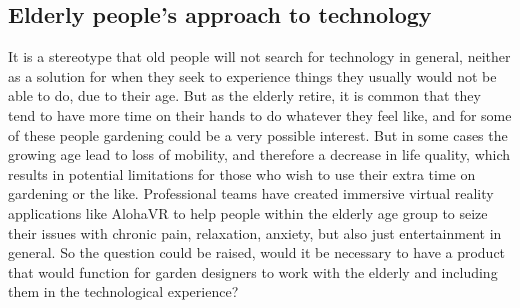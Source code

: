 		\subsection{Elderly people's approach to technology}
		It is a stereotype that old people will not search for technology in general, neither as a solution for when they seek to experience things they usually would not be able to do, due to their age. But as the elderly retire, it is common that they tend to have more time on their hands to do whatever they feel like, and for some of these people gardening could be a very possible interest. But in some cases the growing age lead to loss of mobility, and therefore a decrease in life quality, which results in potential limitations for those who wish to use their extra time on gardening or the like. Professional teams have created immersive virtual reality applications like AlohaVR \cite{elderlyVRScout} to help people within the elderly age group to seize their issues with chronic pain, relaxation, anxiety, but also just entertainment in general. So the question could be raised, would it be necessary to have a product that would function for garden designers to work with the elderly and including them in the technological experience? \\
		
